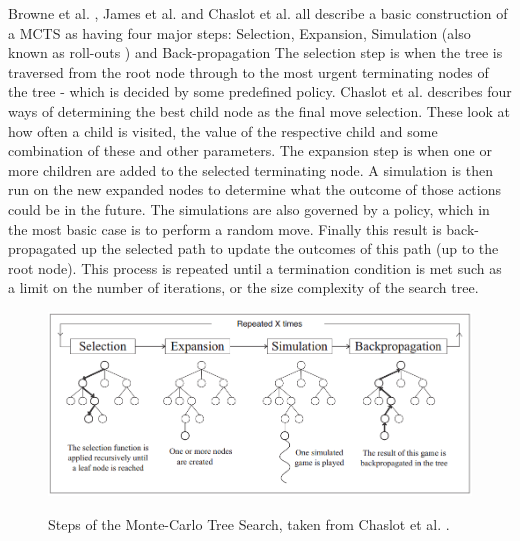 \documentclass[journal]{IEEEtran}
\begin{document}
  Browne et al. \cite{survey}, James et al. \cite{wits} and Chaslot et al. \cite{progressive} all describe a basic construction of a MCTS as having four major steps: Selection, Expansion, Simulation (also known as roll-outs \cite{wits}) and Back-propagation The selection step is when the tree is traversed from the root node through to the most urgent terminating nodes of the tree - which is decided by some predefined policy. Chaslot et al. \cite{progressive} describes four ways of determining the best child node as the final move selection. These look at how often a child is visited, the value of the respective child and some combination of these and other parameters. The expansion step is when one or more children are added to the selected terminating node. A simulation is then run on the new expanded nodes to determine what the outcome of those actions could be in the future. The simulations are also governed by a policy, which in the most basic case is to perform a random move. Finally this result is back-propagated up the selected path to update the outcomes of this path (up to the root node). This process is repeated until a termination condition is met such as a limit on the number of iterations, or the size complexity of the search tree.
  \\
  \begin{figure}[H]
    \includegraphics[width=.50\textwidth,scale=.50]{mcts}\\
    \centering
    \caption{Steps of the Monte-Carlo Tree Search, taken from Chaslot et al. \cite{MCTS_begin}.}
    \label{mcts}
  \end{figure}
  
\end{document}
